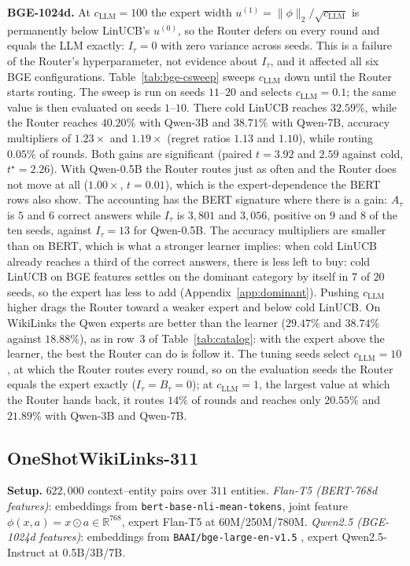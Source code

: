 \documentclass[anon]{alt2027} %
\begin{document}
\textbf{BGE-1024d.} At $c_{\mathrm{LLM}}=100$ the expert width $u^{(1)}=\|\phi\|_2/\sqrt{c_{\mathrm{LLM}}}$
is permanently below LinUCB's $u^{(0)}$, so the Router defers on every round
and equals the LLM exactly: $I_\tau=0$ with zero variance across seeds. This
is a failure of the Router's hyperparameter, not evidence about $I_\tau$, and it
affected all six BGE configurations. Table~\ref{tab:bge-csweep} sweeps $c_{\mathrm{LLM}}$
down until the Router starts routing. The sweep is run on seeds $11$--$20$ and selects
$c_{\mathrm{LLM}}=0.1$; the same value is then evaluated on seeds $1$--$10$. There cold LinUCB
reaches $32.59\%$, while the Router reaches $40.20\%$ with Qwen-3B and
$38.71\%$ with Qwen-7B, accuracy multipliers of $1.23\times$ and $1.19\times$
(regret ratios $1.13$ and $1.10$), while routing $0.05\%$ of rounds. Both gains
are significant (paired $t=3.92$ and $2.59$ against cold, $t^\star=2.26$). With
Qwen-0.5B the Router routes just as often and the Router does not move at all
($1.00\times$, $t=0.01$), which is the expert-dependence the BERT rows also
show. The accounting has the BERT signature where there is a gain: $A_\tau$ is
$5$ and $6$ correct answers while $I_\tau$ is $3{,}801$ and $3{,}056$, positive
on $9$ and $8$ of the ten seeds, against $I_\tau=13$ for Qwen-0.5B. The
accuracy multipliers are smaller than on BERT, which is what a stronger learner implies:
when cold LinUCB already reaches a third of the correct answers, there is less
left to buy: cold LinUCB on BGE features settles on the dominant category
by itself in $7$ of $20$ seeds, so the expert has less to add
(Appendix~\ref{app:dominant}). Pushing $c_{\mathrm{LLM}}$ higher
drags the Router toward a weaker expert and below cold LinUCB. On WikiLinks
the Qwen experts are better than the learner ($29.47\%$ and $38.74\%$ against
$18.88\%$), as in row~3 of Table~\ref{tab:catalog}: with the expert above the
learner, the best the Router can do is follow it. The tuning seeds select
$c_{\mathrm{LLM}}=10$, at which the Router routes every round, so on the evaluation
seeds the Router equals the expert exactly ($I_\tau=B_\tau=0$); at
$c_{\mathrm{LLM}}=1$, the largest value at which the Router hands back, it routes
$14\%$ of rounds and reaches only $20.55\%$ and $21.89\%$ with Qwen-3B and
Qwen-7B.

\subsection{OneShotWikiLinks-311}
\label{app:wiki}

\textbf{Setup.} $622{,}000$ context--entity pairs over $311$ entities.
\emph{Flan-T5 (BERT-768d features)}: embeddings from
\texttt{bert-base-nli-mean-tokens}, joint feature $\phi(x,a)=x\odot a\in\mathbb R^{768}$,
expert Flan-T5 \citep{chung2024scaling} at 60M/250M/780M.
\emph{Qwen2.5 (BGE-1024d features)}: embeddings from
\texttt{BAAI/bge-large-en-v1.5} \citep{xiao2024c}, expert Qwen2.5-Instruct
\citep{hui2024qwen2} at 0.5B/3B/7B.
\end{document}
